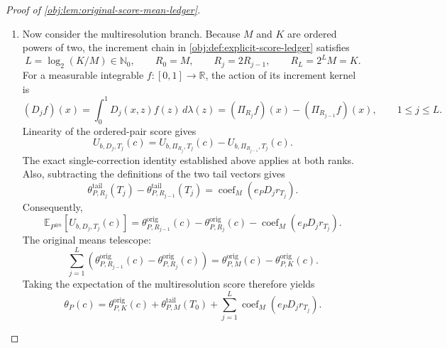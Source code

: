 \documentclass[11pt]{article}
\begin{document}
\begin{proof}[Proof of \cref{obj:lem:original-score-mean-ledger}]
\begin{enumerate}
Since \(0\le e_P\le1\), and cell averaging preserves the almost-everywhere bound on \(r_T\),
\[
|e_Pr_T^{(1)}|\le10T^{1-p}\quad\text{almost everywhere},
\qquad
|e_P\Pi_Jr_T|\le10T^{1-p}\quad\text{everywhere}.
\]
The coefficient norm bound and the triangle inequality give
\[
\begin{aligned}
\|\theta^{\mathrm{tail}}_{P,J}(T)\|_2
&\le
\|\operatorname{coef}_M(e_Pr_T^{(1)})\|_2
+\|\operatorname{coef}_M(e_P\Pi_Jr_T)\|_2\\
&\le10T^{1-p}+10T^{1-p}
=20T^{1-p}.
\end{aligned}
\]
In the single-correction branch, take \(J=K\) and \(T=T_0\). Combining this estimate with the original-mean error bound gives
\[
\begin{aligned}
\|\theta_P(c)-\theta^{\mathrm{wt}}_P(c)\|_2
&\le
\|\theta^{\mathrm{orig}}_{P,K}(c)-\theta^{\mathrm{wt}}_P(c)\|_2
+\|\theta^{\mathrm{tail}}_{P,K}(T_0)\|_2\\
&\le400K^{-S}+20T_0^{1-p}
=B.
\end{aligned}
\]
This calculation applies to every \(c\in\mathbb R\).

\item
Now consider the multiresolution branch. Because \(M\) and \(K\) are ordered powers of two, the increment chain in
\cref{obj:def:explicit-score-ledger} satisfies
\[
L=\log_2(K/M)\in\mathbb N_0,
\qquad
R_0=M,\qquad R_j=2R_{j-1},\qquad R_L=2^LM=K.
\]
For a measurable integrable \(f:[0,1]\to\mathbb R\), the action of its increment kernel is
\[
(D_jf)(x)
=
\int_0^1D_j(x,z)f(z)\,d\lambda(z)
=
(\Pi_{R_j}f)(x)-(\Pi_{R_{j-1}}f)(x),
\qquad 1\le j\le L.
\]
Linearity of the ordered-pair score gives
\[
U_{b,D_j,T_j}(c)
=
U_{b,\Pi_{R_j},T_j}(c)
-
U_{b,\Pi_{R_{j-1}},T_j}(c).
\]
The exact single-correction identity established above applies at both ranks. Also, subtracting the definitions of the two tail vectors gives
\[
\theta^{\mathrm{tail}}_{P,R_j}(T_j)
-
\theta^{\mathrm{tail}}_{P,R_{j-1}}(T_j)
=
\operatorname{coef}_M(e_PD_jr_{T_j}).
\]
Consequently,
\[
\mathbb E_{P^{\otimes n}}[U_{b,D_j,T_j}(c)]
=
\theta^{\mathrm{orig}}_{P,R_{j-1}}(c)
-
\theta^{\mathrm{orig}}_{P,R_j}(c)
-
\operatorname{coef}_M(e_PD_jr_{T_j}).
\]
The original means telescope:
\[
\sum_{j=1}^L
\left(
\theta^{\mathrm{orig}}_{P,R_{j-1}}(c)
-
\theta^{\mathrm{orig}}_{P,R_j}(c)
\right)
=
\theta^{\mathrm{orig}}_{P,M}(c)
-
\theta^{\mathrm{orig}}_{P,K}(c).
\]
Taking the expectation of the multiresolution score therefore yields
\[
\theta_P(c)
=
\theta^{\mathrm{orig}}_{P,K}(c)
+
\theta^{\mathrm{tail}}_{P,M}(T_0)
+
\sum_{j=1}^L\operatorname{coef}_M(e_PD_jr_{T_j}).
\]


\end{enumerate}
\end{proof}
\end{document}
